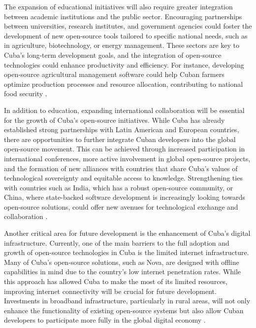 \begin{refsection}
The expansion of educational initiatives will also require greater integration between academic institutions and the public sector. Encouraging partnerships between universities, research institutes, and government agencies could foster the development of new open-source tools tailored to specific national needs, such as in agriculture, biotechnology, or energy management. These sectors are key to Cuba’s long-term development goals, and the integration of open-source technologies could enhance productivity and efficiency. For instance, developing open-source agricultural management software could help Cuban farmers optimize production processes and resource allocation, contributing to national food security \cite[pp.~90-112]{kapcia}.

In addition to education, expanding international collaboration will be essential for the growth of Cuba’s open-source initiatives. While Cuba has already established strong partnerships with Latin American and European countries, there are opportunities to further integrate Cuban developers into the global open-source movement. This can be achieved through increased participation in international conferences, more active involvement in global open-source projects, and the formation of new alliances with countries that share Cuba’s values of technological sovereignty and equitable access to knowledge. Strengthening ties with countries such as India, which has a robust open-source community, or China, where state-backed software development is increasingly looking towards open-source solutions, could offer new avenues for technological exchange and collaboration \cite[pp.~123-145]{perez}.

Another critical area for future development is the enhancement of Cuba’s digital infrastructure. Currently, one of the main barriers to the full adoption and growth of open-source technologies in Cuba is the limited internet infrastructure. Many of Cuba’s open-source solutions, such as Nova, are designed with offline capabilities in mind due to the country’s low internet penetration rates. While this approach has allowed Cuba to make the most of its limited resources, improving internet connectivity will be crucial for future development. Investments in broadband infrastructure, particularly in rural areas, will not only enhance the functionality of existing open-source systems but also allow Cuban developers to participate more fully in the global digital economy \cite[pp.~67-89]{feinberg}.


\end{refsection}
